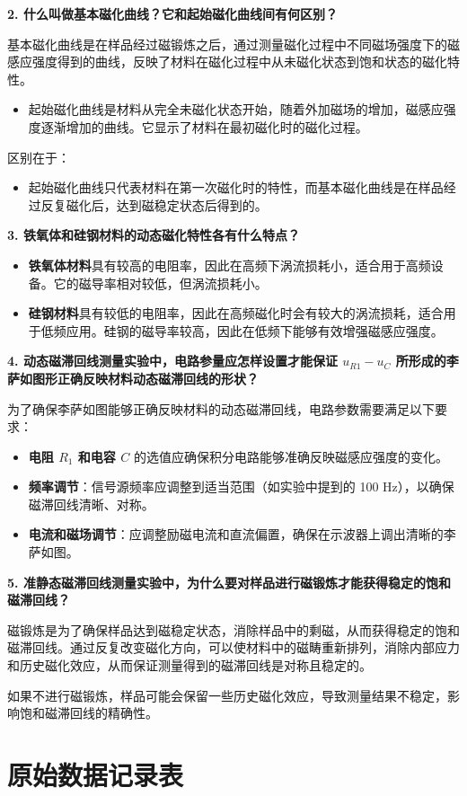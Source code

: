 \documentclass[zihao=5, UTF8]{article}
\theoremstyle{MyLineTheoremStyle} %
\theoremstyle{MyBlockTheoremStyle} %
\theoremstyle{MySubsubsectionStyle} %
\begin{document}
\textbf{2. 什么叫做基本磁化曲线？它和起始磁化曲线间有何区别？}

基本磁化曲线是在样品经过磁锻炼之后，通过测量磁化过程中不同磁场强度下的磁感应强度得到的曲线，反映了材料在磁化过程中从未磁化状态到饱和状态的磁化特性。
\begin{itemize}
    \item 起始磁化曲线是材料从完全未磁化状态开始，随着外加磁场的增加，磁感应强度逐渐增加的曲线。它显示了材料在最初磁化时的磁化过程。
\end{itemize}
区别在于：
\begin{itemize}
    \item 起始磁化曲线只代表材料在第一次磁化时的特性，而基本磁化曲线是在样品经过反复磁化后，达到磁稳定状态后得到的。
\end{itemize}

\textbf{3. 铁氧体和硅钢材料的动态磁化特性各有什么特点？}

\begin{itemize}
    \item \textbf{铁氧体材料}具有较高的电阻率，因此在高频下涡流损耗小，适合用于高频设备。它的磁导率相对较低，但涡流损耗小。
    \item \textbf{硅钢材料}具有较低的电阻率，因此在高频磁化时会有较大的涡流损耗，适合用于低频应用。硅钢的磁导率较高，因此在低频下能够有效增强磁感应强度。
\end{itemize}

\textbf{4. 动态磁滞回线测量实验中，电路参量应怎样设置才能保证 \( u_{R1} - u_C \) 所形成的李萨如图形正确反映材料动态磁滞回线的形状？}

为了确保李萨如图能够正确反映材料的动态磁滞回线，电路参数需要满足以下要求：
\begin{itemize}
    \item \textbf{电阻 \( R_1 \) 和电容 \( C \)} 的选值应确保积分电路能够准确反映磁感应强度的变化。
    \item \textbf{频率调节}：信号源频率应调整到适当范围（如实验中提到的 100 Hz），以确保磁滞回线清晰、对称。
    \item \textbf{电流和磁场调节}：应调整励磁电流和直流偏置，确保在示波器上调出清晰的李萨如图。
\end{itemize}

\textbf{5. 准静态磁滞回线测量实验中，为什么要对样品进行磁锻炼才能获得稳定的饱和磁滞回线？}

磁锻炼是为了确保样品达到磁稳定状态，消除样品中的剩磁，从而获得稳定的饱和磁滞回线。通过反复改变磁化方向，可以使材料中的磁畴重新排列，消除内部应力和历史磁化效应，从而保证测量得到的磁滞回线是对称且稳定的。

如果不进行磁锻炼，样品可能会保留一些历史磁化效应，导致测量结果不稳定，影响饱和磁滞回线的精确性。

\section{原始数据记录表}

\end{document}
